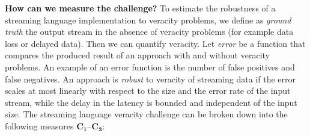 %
%

\textbf{How can we measure the challenge?}
%
To estimate the robustness of a streaming language implementation to
veracity problems, we define as \emph{ground truth} the output stream
in the absence of veracity problems (for example data loss or delayed
data). Then we can quantify veracity. Let \emph{error} be a function
that compares the produced result of an approach with and without
veracity problems.  An example of an error function is the number of
false positives and false negatives.  An approach is \emph{robust} to
veracity of streaming data if the error scales at most linearly with
respect to the size and the error rate of the input stream, while the
delay in the latency is bounded and independent of the input size.
%
The streaming language veracity challenge can be broken down
into the following measures $\mathbf{C_1}$--$\mathbf{C_3}$:

